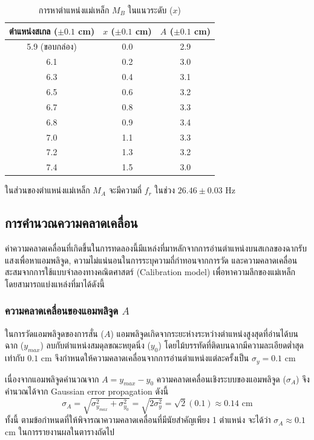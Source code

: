 \documentclass[11pt,a4paper]{article}
\begin{document}
\begin{table}[htbp]
\centering
\caption{การหาตำแหน่งแม่เหล็ก $M_B$ ในแนวระดับ ($x$)}
\renewcommand{\arraystretch}{1.2}
\begin{tabular}{|c|c|c|}
\hline
ตำแหน่งสเกล ($\pm 0.1$ cm) & $x$ ($\pm 0.1$ cm) & $A$ ($\pm 0.1$ cm) \\
\hline
5.9 (ขอบกล่อง) & 0.0 & 2.9 \\
6.1 & 0.2 & 3.0 \\
6.3 & 0.4 & 3.1 \\
6.5 & 0.6 & 3.2 \\
6.7 & 0.8 & 3.3 \\
6.8 & 0.9 & 3.4 \\
7.0 & 1.1 & 3.3 \\
7.2 & 1.3 & 3.2 \\
7.4 & 1.5 & 3.0 \\
\hline
\end{tabular}
\end{table}

ในส่วนของตำแหน่งแม่เหล็ก $M_A$ จะมีความถี่ $f_r$ ในช่วง $26.46 \pm 0.03$ Hz


\newpage
\newpage
\subsection{การคำนวณความคลาดเคลื่อน}

ค่าความคลาดเคลื่อนที่เกิดขึ้นในการทดลองนี้มีแหล่งที่มาหลักจากการอ่านตำแหน่งบนสเกลของฉากรับแสงเพื่อหาแอมพลิจูด, ความไม่แน่นอนในการระบุความถี่กำทอนจากการวัด และความคลาดเคลื่อนสะสมจากการใช้แบบจำลองทางคณิตศาสตร์ (Calibration model) เพื่อหาความลึกของแม่เหล็ก โดยสามารถแบ่งแหล่งที่มาได้ดังนี้

\subsubsection{ความคลาดเคลื่อนของแอมพลิจูด $A$}

ในการวัดแอมพลิจูดของการสั่น ($A$) แอมพลิจูดเกิดจากระยะห่างระหว่างตำแหน่งสูงสุดที่อ่านได้บนฉาก ($y_{max}$) ลบกับตำแหน่งสมดุลขณะหยุดนิ่ง ($y_0$) โดยไม้บรรทัดที่ติดบนฉากมีความละเอียดต่ำสุดเท่ากับ $0.1$ cm จึงกำหนดให้ความคลาดเคลื่อนจากการอ่านตำแหน่งแต่ละครั้งเป็น $\sigma_{y} = 0.1$ cm 

เนื่องจากแอมพลิจูดคำนวณจาก $A = y_{max} - y_0$ ความคลาดเคลื่อนเชิงระบบของแอมพลิจูด ($\sigma_{A}$) จึงคำนวณได้จาก Gaussian error propagation ดังนี้
\[
\sigma_{A} = \sqrt{\sigma_{y_{max}}^2 + \sigma_{y_0}^2} = \sqrt{2\sigma_{y}^2} = \sqrt{2}(0.1) \approx 0.14 \text{ cm}
\]
ทั้งนี้ ตามข้อกำหนดที่ให้พิจารณาความคลาดเคลื่อนที่มีนัยสำคัญเพียง 1 ตำแหน่ง จะได้ว่า $\sigma_A \approx 0.1$ cm ในการรายงานผลในตารางถัดไป
\end{document}
